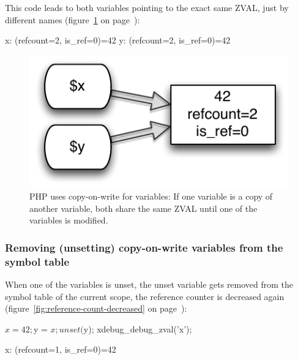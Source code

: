This code leads to both variables pointing to the exact same ZVAL, just by different names (figure~\ref{fig:copy-on-write-variable} on page~\pageref{fig:copy-on-write-variable}):

\begin{textcode}
x: (refcount=2, is_ref=0)=42
y: (refcount=2, is_ref=0)=42
\end{textcode}

\begin{figure}[!h]
  \begin{center}
    \includegraphics[scale=0.8]{images/x_y_42}
    \caption{PHP uses copy-on-write for variables: If one variable is a copy of another variable, both share the same ZVAL until one of the variables is modified.}
    \label{fig:copy-on-write-variable}
  \end{center}
\end{figure}


\subsubsection{Removing (unsetting) copy-on-write variables from the symbol table}
\label{sec:unsetting}

When one of the variables is unset, the unset variable gets removed from the symbol table of the current scope, the reference counter is decreased again (figure~\ref{fig:reference-count-decreased} on page~\pageref{fig:reference-count-decreased}):

\begin{phpcode}
$x = 42;
$y = $x;
unset($y);
xdebug_debug_zval('x');
\end{phpcode}

\begin{textcode}
x: (refcount=1, is_ref=0)=42
\end{textcode}

